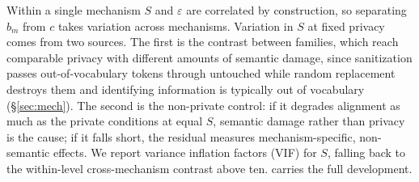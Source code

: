 Within a single mechanism $S$ and $\varepsilon$ are correlated by construction,
so separating $b_m$ from $c$ takes variation across mechanisms.
Variation in $S$ at fixed privacy comes from two sources.
The first is the contrast between families,
which reach comparable privacy with different amounts of semantic damage,
since sanitization passes out-of-vocabulary tokens through untouched while random replacement destroys them and identifying information is typically out of vocabulary (\S\ref{sec:mech}).
The second is the non-private control:
if it degrades alignment as much as the private conditions at equal $S$,
semantic damage rather than privacy is the cause;
if it falls short,
the residual measures mechanism-specific,
non-semantic effects.
We report variance inflation factors (VIF) for $S$,
falling back to the within-level cross-mechanism contrast above ten.
 carries the full development.
